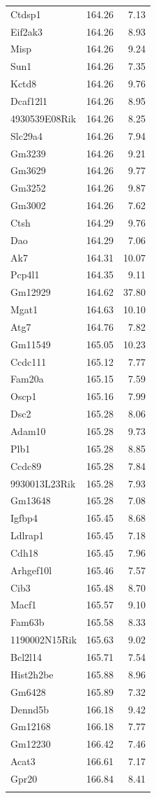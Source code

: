 \documentclass[oneside]{book}\usepackage[]{graphicx}\usepackage[]{color}
\begin{document}
{\begin{longtable}{lrr}
  Ctdsp1 & 164.26 & 7.13 \\
  Eif2ak3 & 164.26 & 8.93 \\
  Misp & 164.26 & 9.24 \\
  Sun1 & 164.26 & 7.35 \\
  Kctd8 & 164.26 & 9.76 \\
  Dcaf12l1 & 164.26 & 8.95 \\
  4930539E08Rik & 164.26 & 8.25 \\
  Slc29a4 & 164.26 & 7.94 \\
  Gm3239 & 164.26 & 9.21 \\
  Gm3629 & 164.26 & 9.77 \\
  Gm3252 & 164.26 & 9.87 \\
  Gm3002 & 164.26 & 7.62 \\
  Ctsh & 164.29 & 9.76 \\
  Dao & 164.29 & 7.06 \\
  Ak7 & 164.31 & 10.07 \\
  Pcp4l1 & 164.35 & 9.11 \\
  Gm12929 & 164.62 & 37.80 \\
  Mgat1 & 164.63 & 10.10 \\
  Atg7 & 164.76 & 7.82 \\
  Gm11549 & 165.05 & 10.23 \\
  Ccdc111 & 165.12 & 7.77 \\
  Fam20a & 165.15 & 7.59 \\
  Oscp1 & 165.16 & 7.99 \\
  Dsc2 & 165.28 & 8.06 \\
  Adam10 & 165.28 & 9.73 \\
  Plb1 & 165.28 & 8.85 \\
  Ccdc89 & 165.28 & 7.84 \\
  9930013L23Rik & 165.28 & 7.93 \\
  Gm13648 & 165.28 & 7.08 \\
  Igfbp4 & 165.45 & 8.68 \\
  Ldlrap1 & 165.45 & 7.18 \\
  Cdh18 & 165.45 & 7.96 \\
  Arhgef10l & 165.46 & 7.57 \\
  Cib3 & 165.48 & 8.70 \\
  Macf1 & 165.57 & 9.10 \\
  Fam63b & 165.58 & 8.33 \\
  1190002N15Rik & 165.63 & 9.02 \\
  Bcl2l14 & 165.71 & 7.54 \\
  Hist2h2be & 165.88 & 8.96 \\
  Gm6428 & 165.89 & 7.32 \\
  Dennd5b & 166.18 & 9.42 \\
  Gm12168 & 166.18 & 7.77 \\
  Gm12230 & 166.42 & 7.46 \\
  Acat3 & 166.61 & 7.17 \\
  Gpr20 & 166.84 & 8.41 \\
   \hline
  
  \label{tab:hot-annot}

\end{longtable}
}
\end{document}
